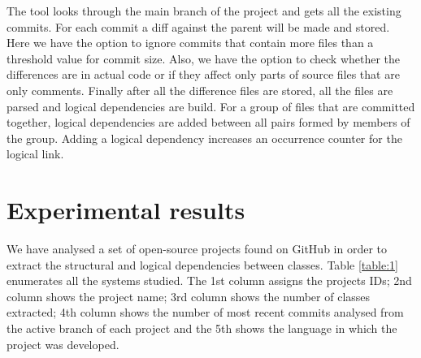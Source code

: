 \documentclass[a4paper,twoside]{article}
\begin{document}
The tool looks through the main branch of the project and gets all the existing commits. For each commit a diff against the parent will be made and stored. Here we have the option to ignore commits that contain more files than a threshold value for commit size. Also, we have the option to check whether the differences are in actual code or if they affect only parts of source files that are only comments.  Finally after all the difference files are stored, all the files are parsed and logical dependencies are build. For a group of files that are committed together, logical dependencies are added between all pairs formed by members of the group. Adding a logical dependency increases an occurrence counter for the logical link. 

\section{Experimental results}
\label{sec:experiments}


We have analysed a set of open-source projects found on GitHub in order to extract the structural and logical dependencies between classes. Table \ref{table:1} enumerates all the systems studied. The 1st column assigns the projects IDs; 2nd column shows the project name; 3rd column shows the number of classes extracted; 4th column shows the number of most recent commits analysed from the active branch of each project and the 5th shows the language in which the project was developed.
\end{document}
